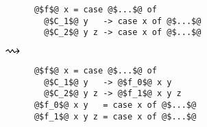 \begin{center}
  \begin{minipage}[t]{0.3\textwidth}
    \begin{verbatim}
      @$f$@ x = case @$...$@ of
        @$C_1$@ y   -> case x of @$...$@
        @$C_2$@ y z -> case x of @$...$@
    \end{verbatim}
  \end{minipage}
  \begin{minipage}[c]{0.1\textwidth}
    $\mathlarger{\mathlarger{\mathlarger{\rightsquigarrow}}}$
  \end{minipage}
  \begin{minipage}[t]{0.35\textwidth}
    \begin{verbatim}
      @$f$@ x = case @$...$@ of
        @$C_1$@ y   -> @$f_0$@ x y
        @$C_2$@ y z -> @$f_1$@ x y z
      @$f_0$@ x y   = case x of @$...$@
      @$f_1$@ x y z = case x of @$...$@
    \end{verbatim}
  \end{minipage}
\end{center}
